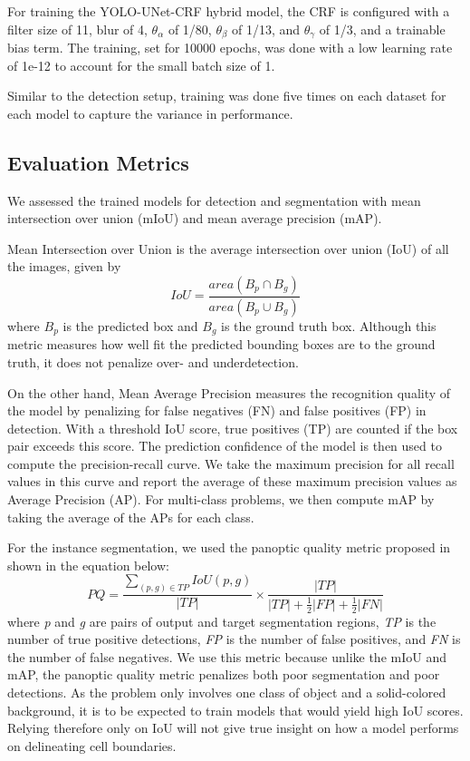 \documentclass[journal]{IEEEtran}
\begin{document}
For training the YOLO-UNet-CRF hybrid model, the CRF is configured with a filter size of 11, blur of 4, $\theta_\alpha$ of 1/80, $\theta_\beta$ of 1/13, and $\theta_\gamma$ of 1/3, and a trainable bias term. The training, set for 10000 epochs, was done with a low learning rate of 1e-12 to account for the small batch size of 1. 

Similar to the detection setup, training was done five times on each dataset for each model to capture the variance in performance.
\subsection{Evaluation Metrics}
We assessed the trained models for detection and segmentation with mean intersection over union (mIoU) and mean average precision (mAP). 

Mean Intersection over Union is the average intersection over union (IoU) of all the images, given by
\begin{equation}
IoU = \frac{area(B_{p}\cap B_{g})}{area(B_{p}\cup B_{g})}
\end{equation}
where \textit{$B_p$} is the predicted box and \textit{$B_g$} is the ground truth box. Although this metric measures how well fit the predicted bounding boxes are to the ground truth, it does not penalize over- and underdetection.

On the other hand, Mean Average Precision measures the recognition quality of the model by penalizing for false negatives (FN) and false positives (FP) in detection. With a threshold IoU score, true positives (TP) are counted if the box pair exceeds this score. The prediction confidence of the model is then used to compute the precision-recall curve. We take the maximum precision for all recall values in this curve and report the average of these maximum precision values as Average Precision (AP). For multi-class problems, we then compute mAP by taking the average of the APs for each class.

For the instance segmentation, we used the panoptic quality metric proposed in \cite{DBLP:journals/corr/abs-1801-00868} shown in the equation below:
\begin{equation}
PQ = \frac{\sum_{(p,g)\in TP}IoU(p,g)}{|TP|} \times \frac{|TP|}{|TP| + \frac{1}{2}|FP| + \frac{1}{2}|FN|}
\end{equation}
where \textit{p} and \textit{g} are pairs of output and target segmentation regions, \textit{TP} is the number of true positive detections, \textit{FP} is the number of false positives, and \textit{FN} is the number of false negatives. We use this metric because unlike the mIoU and mAP, the panoptic quality metric penalizes both poor segmentation and poor detections. As the problem only involves one class of object and a solid-colored background, it is to be expected to train models that would yield high IoU scores. Relying therefore only on IoU will not give true insight on how a model performs on delineating cell boundaries.
\end{document}
